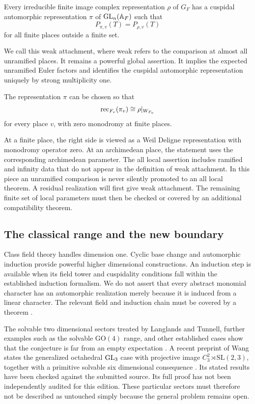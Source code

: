 \begin{conjecture}\label{conj:strong_artin_weak}
Every irreducible finite image complex representation \(\rho\) of \(G_F\) has a cuspidal automorphic representation \(\pi\) of \(\operatorname{GL}_n(\mathbb A_F)\) such that
\[
 P_{\pi,v}(T)=P_{\rho,v}(T)
\]
for all finite places outside a finite set.
\end{conjecture}

We call this weak attachment, where weak refers to the comparison at almost all unramified places. It remains a powerful global assertion. It implies the expected unramified Euler factors and identifies the cuspidal automorphic representation uniquely by strong multiplicity one.

\begin{conjecture}\label{conj:strong_artin_full}
The representation \(\pi\) can be chosen so that
\[
 \operatorname{rec}_{F_v}(\pi_v)\cong\rho|_{W_{F_v}}
\]
for every place \(v\), with zero monodromy at finite places.
\end{conjecture}

At a finite place, the right side is viewed as a Weil Deligne representation with monodromy operator zero. At an archimedean place, the statement uses the corresponding archimedean parameter. The all local assertion includes ramified and infinity data that do not appear in the definition of weak attachment. In this piece an unramified comparison is never silently promoted to an all local theorem. A residual realization will first give weak attachment. The remaining finite set of local parameters must then be checked or covered by an additional compatibility theorem.

\subsection{The classical range and the new boundary}

Class field theory handles dimension one. Cyclic base change and automorphic induction provide powerful higher dimensional constructions. An induction step is available when its field tower and cuspidality conditions fall within the established induction formalism. We do not assert that every abstract monomial character has an automorphic realization merely because it is induced from a linear character. The relevant field and induction chain must be covered by a theorem \cite{ArthurClozel1989}.

The solvable two dimensional sectors treated by Langlands and Tunnell, further examples such as the solvable \(\mathrm{GO}(4)\) range, and other established cases show that the conjecture is far from an empty expectation \cite{Langlands1980,Tunnell1981,Ramakrishnan2002}. A recent preprint of Wang states the generalized octahedral \(\operatorname{GL}_3\) case with projective image \(C_3^2\rtimes\mathrm{SL}(2,3)\), together with a primitive solvable six dimensional consequence \cite{Wang2026}. Its stated results have been checked against the submitted source. Its full proof has not been independently audited for this edition. These particular sectors must therefore not be described as untouched simply because the general problem remains open.

